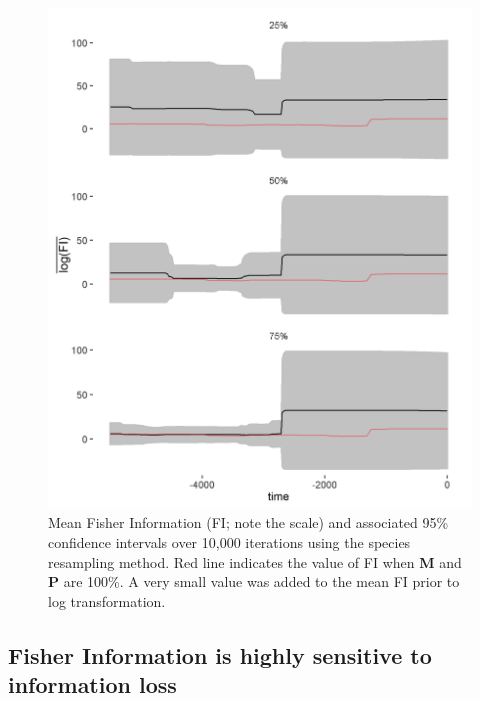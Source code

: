 \documentclass[print]{nuthesis}
\begin{document}
\begin{figure}
\includegraphics[width=0.85\linewidth]{./chapterFiles/resampling/figsCalledInDiss/logFI_species_ribboned_facetByProb} \caption{Mean Fisher Information (FI; note the scale) and associated 95\% confidence intervals over 10,000 iterations using the species resampling method. Red line indicates the value of FI when \textbf{M} and \textbf{P} are 100\%. A very small value was added to the mean FI prior to log transformation.}\label{fig:fiResamp}
\end{figure}
\hypertarget{fisher-information-is-highly-sensitive-to-information-loss}{%
\subsection{Fisher Information is highly sensitive to information loss}\label{fisher-information-is-highly-sensitive-to-information-loss}}
\end{document}

